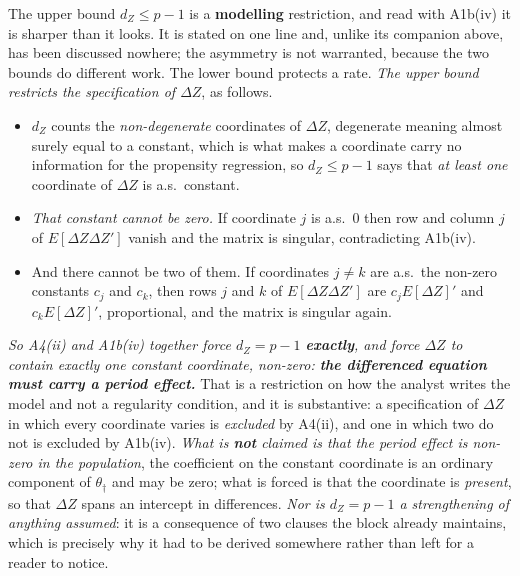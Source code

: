 \medskip
\noindent
 The upper bound $d_Z\le p-1$ is a \textbf{modelling} restriction, and read with A1b(iv) it is
sharper than it looks. It is stated on one line and, unlike its companion above, has been discussed
nowhere; the asymmetry is not warranted, because the two bounds do different work. The lower bound
protects a rate. \emph{The upper bound restricts the specification of $\Delta Z$}, as follows.
\begin{itemize}
\item[--] $d_Z$ counts the \emph{non-degenerate} coordinates of $\Delta Z$, degenerate meaning almost
surely equal to a constant, which is what makes a coordinate carry no information for the propensity
regression, so $d_Z\le p-1$ says that \emph{at least one} coordinate of $\Delta Z$ is a.s.\ constant.
\item[--] \emph{That constant cannot be zero.} If coordinate $j$ is a.s.\ $0$ then row and column $j$ of
$E[\Delta Z\Delta Z']$ vanish and the matrix is singular, contradicting A1b(iv).
\item[--] And there cannot be two of them. If coordinates $j\ne k$ are a.s.\ the non-zero
constants $c_j$ and $c_k$, then rows $j$ and $k$ of $E[\Delta Z\Delta Z']$ are $c_jE[\Delta Z]'$ and
$c_kE[\Delta Z]'$, proportional, and the matrix is singular again.
\end{itemize}
\emph{So A4(ii) and A1b(iv) together force $d_Z=p-1$ \textbf{exactly}, and force $\Delta Z$ to contain
exactly one constant coordinate, non-zero: \textbf{the differenced equation must carry a period effect.}}
That is a restriction on how the analyst writes the model and not a regularity condition, and it is
substantive: a specification of $\Delta Z$ in which every coordinate varies is \emph{excluded} by A4(ii),
and one in which two do not is excluded by A1b(iv). \emph{What is \textbf{not} claimed is that the
period effect is non-zero in the population}, the coefficient on the constant coordinate is an
ordinary component of $\theta_\dagger$ and may be zero; what is forced is that the coordinate is
\emph{present}, so that $\Delta Z$ spans an intercept in differences. \emph{Nor is $d_Z=p-1$ a
strengthening of anything assumed}: it is a consequence of two clauses the block already maintains, which
is precisely why it had to be derived somewhere rather than left for a reader to notice.

